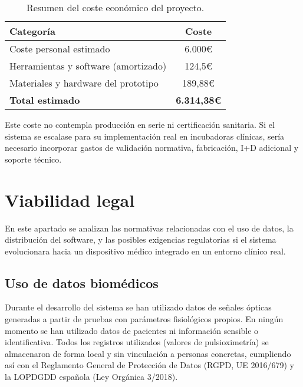 \begin{table}[H]
\centering
\begin{tabular}{|l|c|}
\hline
\textbf{Categoría} & \textbf{Coste } \\
\hline
Coste personal estimado            & 6.000€ \\
Herramientas y software (amortizado) & 124{,}5€ \\
Materiales y hardware del prototipo & 189,88€ \\
\hline
\textbf{Total estimado}             & \textbf{6.314,38€} \\
\hline
\end{tabular}
\caption{Resumen del coste económico del proyecto.}
\label{tab:coste_total}
\end{table}

\noindent Este coste no contempla producción en serie ni certificación sanitaria. Si el sistema se escalase para su implementación real en incubadoras clínicas, sería necesario incorporar gastos de validación normativa, fabricación, I+D adicional y soporte técnico.


\section{Viabilidad legal}

En este apartado se analizan las normativas relacionadas con el uso de datos, la distribución del software, y las posibles exigencias regulatorias si el sistema evolucionara hacia un dispositivo médico integrado en un entorno clínico real. 

\vspace{0.3cm}
\subsection{Uso de datos biomédicos}

Durante el desarrollo del sistema se han utilizado datos de señales ópticas  generadas a partir de pruebas con parámetros fisiológicos propios. En ningún momento se han utilizado datos de pacientes ni información sensible o identificativa. Todos los registros utilizados (valores de pulsioximetría) se almacenaron de forma local y sin vinculación a personas concretas, cumpliendo así con el Reglamento General de Protección de Datos (RGPD, UE 2016/679) y la LOPDGDD española (Ley Orgánica 3/2018).

